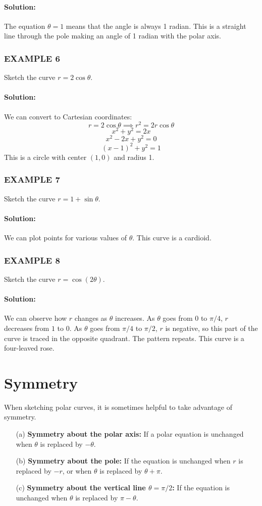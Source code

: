 \documentclass{article}
\begin{document}
\paragraph{Solution:} The equation $\theta=1$ means that the angle is always 1 radian. This is a straight line through the pole making an angle of 1 radian with the polar axis.

\subsubsection*{EXAMPLE 6}
Sketch the curve $r=2\cos\theta$.

\paragraph{Solution:} We can convert to Cartesian coordinates:
\[ r = 2\cos\theta \implies r^2 = 2r\cos\theta \]
\[ x^2 + y^2 = 2x \]
\[ x^2 - 2x + y^2 = 0 \]
\[ (x-1)^2 + y^2 = 1 \]
This is a circle with center $(1,0)$ and radius 1.

\subsubsection*{EXAMPLE 7}
Sketch the curve $r=1+\sin\theta$.

\paragraph{Solution:} We can plot points for various values of $\theta$. This curve is a cardioid.

\subsubsection*{EXAMPLE 8}
Sketch the curve $r=\cos(2\theta)$.

\paragraph{Solution:} We can observe how $r$ changes as $\theta$ increases. As $\theta$ goes from $0$ to $\pi/4$, $r$ decreases from $1$ to $0$. As $\theta$ goes from $\pi/4$ to $\pi/2$, $r$ is negative, so this part of the curve is traced in the opposite quadrant. The pattern repeats. This curve is a four-leaved rose.

\section*{Symmetry}
When sketching polar curves, it is sometimes helpful to take advantage of symmetry.
\begin{enumerate}
    \item[(a)] \textbf{Symmetry about the polar axis:} If a polar equation is unchanged when $\theta$ is replaced by $-\theta$.
    \item[(b)] \textbf{Symmetry about the pole:} If the equation is unchanged when $r$ is replaced by $-r$, or when $\theta$ is replaced by $\theta+\pi$.
    \item[(c)] \textbf{Symmetry about the vertical line $\theta=\pi/2$:} If the equation is unchanged when $\theta$ is replaced by $\pi-\theta$.
\end{enumerate}
\end{document}
